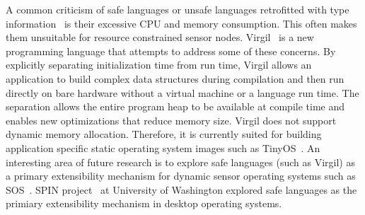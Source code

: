 A common criticism of safe languages or unsafe languages retrofitted
with type information~\cite{ccured02necula} is their excessive CPU and
memory consumption.
%
This often makes them unsuitable for resource constrained sensor
nodes.
%
Virgil~\cite{titzer06virgil} is a new programming language that
attempts to address some of these concerns.
%
By explicitly separating initialization time from run time, Virgil
allows an application to build complex data structures during
compilation and then run directly on bare hardware without a virtual
machine or a language run time.
%
The separation allows the entire program heap to be available at
compile time and enables new optimizations that reduce memory size.
%
Virgil does not support dynamic memory allocation.
%
Therefore, it is currently suited for building application specific
static operating system images such as TinyOS~\cite{levis05t2}.
%
An interesting area of future research is to explore safe languages
(such as Virgil) as a primary extensibility mechanism for dynamic
sensor operating systems such as SOS~\cite{ram05sos}.
%
SPIN project~\cite{spin95sosp} at University of Washington explored
safe languages as the primiary extensibility mechanism in desktop
operating systems.

